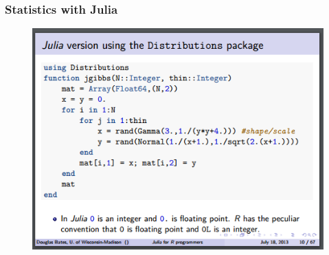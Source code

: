\documentclass[Master.tex]{subfiles}
\begin{document}
\begin{frame}[fragile]
	\frametitle{Statistics with Julia}
	\large
	
	\begin{figure}
		\centering
		\includegraphics[width=0.98\linewidth]{images/Dougbates-R3}
		\caption{}
		\label{fig:Dougbates-R3}
	\end{figure}
	
\end{frame}
\end{document}

